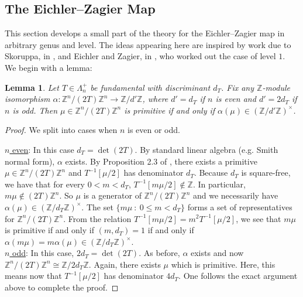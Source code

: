 \documentclass[11pt]{article}
\newtheorem{lemma}[theorem]{Lemma}
\theoremstyle{definition}
\theoremstyle{remark}
\newcommand{\Z}{\mathbb{Z}}
\begin{document}
\subsection{The Eichler--Zagier Map} \label{The Eichler--Zagier Map}

This section develops a small part of the theory for the Eichler--Zagier map in arbitrary genus and level. The ideas appearing here are inspired by work due to Skoruppa, in \cite{Skoruppa}, and Eichler and Zagier, in \cite{EZ}, who worked out the case of level $1$. \\

We begin with a lemma:

\begin{lemma} \label{primitivity lemma}
    Let $T \in \Lambda_n^+$ be fundamental with discriminant $d_T$. Fix any $\Z$-module isomorphism $\alpha:\Z^n/(2T)\Z^n \to \Z/d'\Z$, where $d' = d_T$ if $n$ is even and $d' = 2d_T$ if $n$ is odd. Then $\mu \in \Z^n/(2T)\Z^n$ is primitive if and only if $\alpha(\mu) \in (\Z/d'\Z)^\times$. 
\end{lemma}

\begin{proof}
    We split into cases when $n$ is even or odd. 

    \underline{$n$ even}: In this case $d_T = \det(2T)$. By standard linear algebra (e.g. Smith normal form), $\alpha$ exists. By Proposition 2.3 of \cite{BD}, there exists a primitive $\mu \in \Z^n/(2T)\Z^n$ and $T^{-1}[\mu/2]$ has denominator $d_T$. Because $d_T$ is square-free, we have that for every $0 < m < d_T$, $T^{-1}[m\mu/2] \notin \Z$. In particular, $m\mu \notin (2T)\Z^n$. So $\mu$ is a generator of $\Z^n/(2T)\Z^n$ and we necessarily have $\alpha(\mu) \in (\Z/d_T\Z)^\times$. The set $\{m\mu \ : \ 0 \leq m < d_T\}$ forms a set of representatives for $\Z^n/(2T)\Z^n$. From the relation $T^{-1}[m\mu/2] = m^2T^{-1}[\mu/2]$, we see that $m\mu$ is primitive if and only if $(m,d_T) = 1$ if and only if $\alpha(m\mu) = m\alpha(\mu) \in (\Z/d_T\Z)^\times$. \\

    \underline{$n$ odd}: In this case, $2d_T = \det(2T)$. As before, $\alpha$ exists and now $\Z^n/(2T)\Z^n \cong \Z/2d_T\Z$. Again, there exists $\mu$ which is primitive. Here, this means now that $T^{-1}[\mu/2]$ has denominator $4d_T$. One follows the exact argument above to complete the proof.


    
\end{proof}
\end{document}
